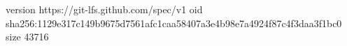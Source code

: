 version https://git-lfs.github.com/spec/v1
oid sha256:1129e317c149b9675d7561afc1caa58407a3e4b98e7a4924f87c4f3daa3f1bc0
size 43716
